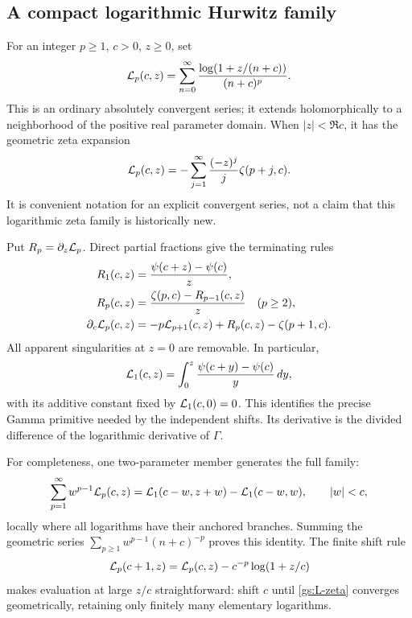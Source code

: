 \subsection{A compact logarithmic Hurwitz family}

For an integer $p\ge1$, $c>0$, $z\ge0$, set
\begin{equation}\label{gs:L-definition}
 \mathcal L_p(c,z)=\sum_{n=0}^\infty
       \frac{\log(1+z/(n+c))}{(n+c)^p}.
\end{equation}
This is an ordinary absolutely convergent series; it extends
holomorphically to a neighborhood of the positive real parameter
domain.  When $|z|<\Re c$, it has the geometric zeta expansion
\begin{equation}\label{gs:L-zeta}
 \mathcal L_p(c,z)=-\sum_{j=1}^\infty
                    \frac{(-z)^j}{j}\zeta(p+j,c).
\end{equation}
It is convenient notation for an explicit convergent series, not a
claim that this logarithmic zeta family is historically new.

Put $R_p=\partial_z\mathcal L_p$.  Direct partial fractions give the
terminating rules
\begin{align}
 R_1(c,z)&=\frac{\psi(c+z)-\psi(c)}z,\label{gs:R1}\\
 R_p(c,z)&=\frac{\zeta(p,c)-R_{p-1}(c,z)}z\quad(p\ge2),\label{gs:Rp}\\
 \partial_c\mathcal L_p(c,z)
 &=-p\mathcal L_{p+1}(c,z)+R_p(c,z)-\zeta(p+1,c).
 \label{gs:L-derivative}
\end{align}
All apparent singularities at $z=0$ are removable.  In particular,
\begin{equation}\label{gs:Gamma-primitive}
 \mathcal L_1(c,z)=\int_0^z\frac{\psi(c+y)-\psi(c)}y\,dy,
\end{equation}
with its additive constant fixed by $\mathcal L_1(c,0)=0$.
This identifies the precise Gamma primitive needed by the independent
shifts.  Its derivative is the divided difference of the logarithmic
derivative of $\Gamma$.

For completeness, one two-parameter member generates the full family:
\begin{equation}\label{gs:L-generator}
 \sum_{p=1}^\infty w^{p-1}\mathcal L_p(c,z)
 =\mathcal L_1(c-w,z+w)-\mathcal L_1(c-w,w),\qquad |w|<c,
\end{equation}
locally where all logarithms have their anchored branches.  Summing
the geometric series $\sum_{p\ge1}w^{p-1}(n+c)^{-p}$ proves this
identity.  The finite shift rule
\begin{equation}\label{gs:L-shift}
 \mathcal L_p(c+1,z)=\mathcal L_p(c,z)-c^{-p}\log(1+z/c)
\end{equation}
makes evaluation at large $z/c$ straightforward: shift $c$ until
\eqref{gs:L-zeta} converges geometrically, retaining only finitely
many elementary logarithms.

